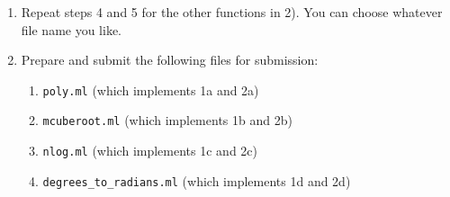 \documentclass{article}
\begin{document}
\begin{enumerate}
\item Repeat steps 4 and 5 for the other functions in 2). You can choose whatever file name you like.

\item Prepare and submit the following files for submission:

	\begin{enumerate}
		\item {\tt poly.ml} (which implements 1a and 2a)
		\item {\tt mcuberoot.ml} (which implements 1b and 2b)
		\item {\tt nlog.ml} (which implements 1c and 2c)
		\item {\tt degrees\_to\_radians.ml} (which implements 1d and 2d)

	\end{enumerate}

\end{enumerate}
\end{document}
